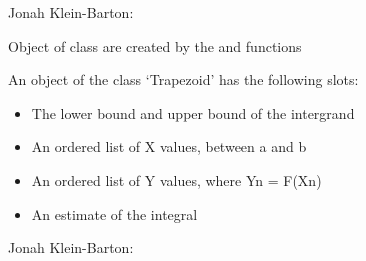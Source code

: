 \documentclass[a4paper]{book}
\begin{document}
%
\begin{Author}\relax
Jonah Klein-Barton: 
\end{Author}
%
\begin{Description}\relax
Object of class  are created by the  and  functions
\end{Description}
%
\begin{Details}\relax
An object of the class `Trapezoid' has the following slots:
\begin{itemize}

\item {} The lower bound and upper bound of the intergrand
\item {} An ordered list of X values, between a and b
\item {} An ordered list of Y values, where Yn = F(Xn)
\item {} An estimate of the integral

\end{itemize}

\end{Details}
%
\begin{Author}\relax
Jonah Klein-Barton: 
\end{Author}
\printindex{}
\end{document}
